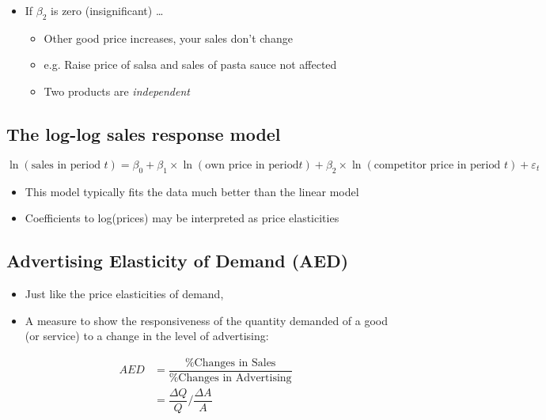 \documentclass[10pt,article]{article}
\begin{document}
\begin{itemize}
\item If \(\beta_2\) is zero (insignificant) \ldots{}
\begin{itemize}
\item Other good price increases, your sales  don't change
\item e.g. Raise price of salsa and sales of pasta sauce not affected
\item Two products are \emph{independent}
\end{itemize}
\end{itemize}
\subsection{The log-log sales response model}
\label{sec:orgde18dcb}

\[ \ln(\text{sales in period } t) = \beta_0 + \beta_1 \times \ln(\text{own
    price in period} t) + 
   \beta_2 \times \ln(\text{competitor price in period } t)  + \varepsilon_t
\]
\begin{itemize}
\item This model typically fits the data much better than the linear model
\item Coefficients to log(prices) may be interpreted as price elasticities
\end{itemize}
\subsection{Advertising Elasticity of Demand (AED)}
\label{sec:orgf3f6099}

\begin{itemize}
\item Just like the price elasticities of demand,
\item A measure to show the responsiveness of the quantity demanded of a good (or
service) to a change in the level of advertising:
\end{itemize}

\begin{align*}
  AED  & = \dfrac{\% \text{Changes in Sales}}{\% \text{Changes in Advertising}} \\
        & = \dfrac {\Delta Q}{Q} \Bigg/ \dfrac {\Delta A}{A}  \\
\end{align*}
\end{document}
